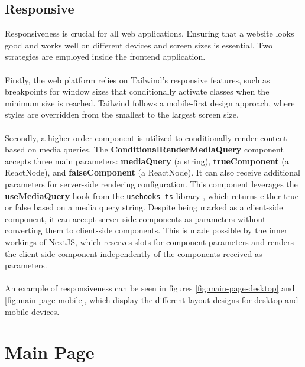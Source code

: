 \subsection{Responsive}

\noindent Responsiveness is crucial for all web applications. Ensuring that a website looks good and works well on different devices and screen sizes is essential. Two strategies are employed inside the frontend application.
\\\\
\noindent Firstly, the web platform relies on Tailwind's responsive features, such as breakpoints for window sizes that conditionally activate classes when the minimum size is reached. Tailwind follows a mobile-first design approach, where styles are overridden from the smallest to the largest screen size.
\\\\
\noindent Secondly, a higher-order component is utilized to conditionally render content based on media queries. The \textbf{ConditionalRenderMediaQuery} component accepts three main parameters: \textbf{mediaQuery} (a string), \textbf{trueComponent} (a ReactNode), and \textbf{falseComponent} (a ReactNode). It can also receive additional parameters for server-side rendering configuration. This component leverages the \textbf{useMediaQuery} hook from the \texttt{usehooks-ts} library \cite{usehooks-ts}, which returns either true or false based on a media query string. Despite being marked as a client-side component, it can accept server-side components as parameters without converting them to client-side components. This is made possible by the inner workings of NextJS, which reserves slots for component parameters and renders the client-side component independently of the components received as parameters.
\\\\
\noindent An example of responsiveness can be seen in figures \ref{fig:main-page-desktop} and \ref{fig:main-page-mobile}, which display the different layout designs for desktop and mobile devices.

\section{Main Page}

